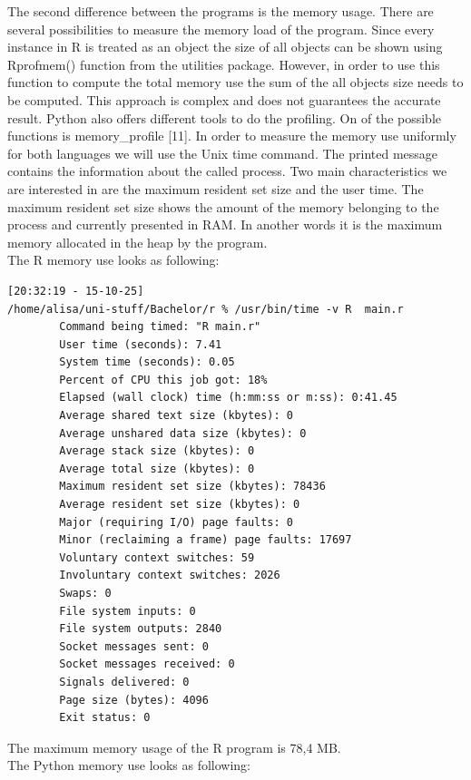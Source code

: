 \documentclass [twoside,
  11pt, a4paper,
  footinclude=true,
  headinclude=true,
  cleardoublepage=empty
]{article}
\begin{document}
The second difference between the programs is the memory usage. There are several possibilities to measure the memory load of the program. Since every instance in R is treated as an object the size of all objects can be shown using Rprofmem() function from the utilities package. However, in order to use this function to compute the total memory use the sum of the all objects size needs to be computed. This approach is complex and does not guarantees the accurate result. Python also offers different tools to do the profiling. On of the possible functions is memory\_profile [11]. In order to measure the memory use uniformly for both languages we will use the Unix time command. The printed message contains the information about the called process. Two main characteristics we are interested in are the maximum resident set size and the user time. The maximum resident set size shows the amount of the memory belonging to the process and currently presented in RAM. In another words it is the maximum memory allocated in the heap by the program.\\ 
The R memory use looks as following:
\begin{verbatim}
[20:32:19 - 15-10-25] 
/home/alisa/uni-stuff/Bachelor/r % /usr/bin/time -v R  main.r
        Command being timed: "R main.r"
        User time (seconds): 7.41
        System time (seconds): 0.05
        Percent of CPU this job got: 18%
        Elapsed (wall clock) time (h:mm:ss or m:ss): 0:41.45
        Average shared text size (kbytes): 0
        Average unshared data size (kbytes): 0
        Average stack size (kbytes): 0
        Average total size (kbytes): 0
        Maximum resident set size (kbytes): 78436
        Average resident set size (kbytes): 0
        Major (requiring I/O) page faults: 0
        Minor (reclaiming a frame) page faults: 17697
        Voluntary context switches: 59
        Involuntary context switches: 2026
        Swaps: 0
        File system inputs: 0
        File system outputs: 2840
        Socket messages sent: 0
        Socket messages received: 0
        Signals delivered: 0
        Page size (bytes): 4096
        Exit status: 0
\end{verbatim}
The maximum memory usage of the R program is 78,4 MB.\\
The Python memory use looks as following:
\end{document}
